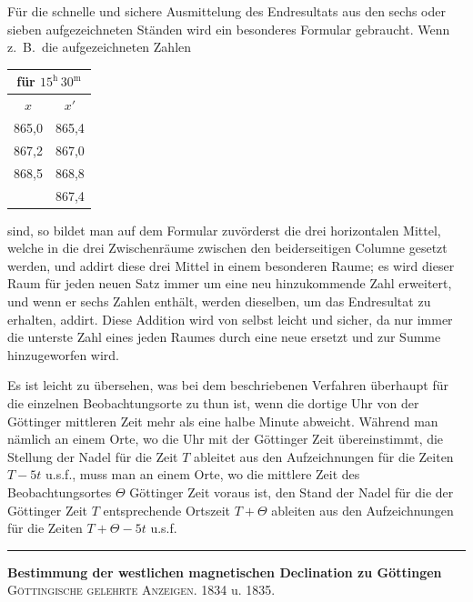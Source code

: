 \documentclass[12pt,a4paper]{article}
\begin{document}
\newpage
\noindent
F\"ur die schnelle und sichere Ausmittelung des Endresultats aus den sechs oder sieben aufgezeichneten St\"anden wird ein besonderes Formular gebraucht. Wenn z.~B.\ die aufgezeichneten Zahlen
\begin{center}
\begin{tabular}{c|c}
\multicolumn{2}{c}{f\"ur $15^{\text{h}}\,30^{\text{m}}$} \\
\hline
$x$ & $x'$ \\
\hline
865{,}0 & 865{,}4 \\
867{,}2 & 867{,}0 \\
868{,}5 & 868{,}8 \\
\hline
& 867{,}4
\end{tabular}
\end{center}

\noindent
sind, so bildet man auf dem Formular zuv\"orderst die drei horizontalen Mittel, welche in die drei Zwischenr\"aume zwischen den beiderseitigen Columne gesetzt werden, und addirt diese drei Mittel in einem besonderen Raume; es wird dieser Raum f\"ur jeden neuen Satz immer um eine neu hinzukommende Zahl erweitert, und wenn er sechs Zahlen enth\"alt, werden dieselben, um das Endresultat zu erhalten, addirt. Diese Addition wird von selbst leicht und sicher, da nur immer die unterste Zahl eines jeden Raumes durch eine neue ersetzt und zur Summe hinzugeworfen wird.

Es ist leicht zu \"ubersehen, was bei dem beschriebenen Verfahren \"uberhaupt f\"ur die einzelnen Beobachtungsorte zu thun ist, wenn die dortige Uhr von der G\"ottinger mittleren Zeit mehr als eine halbe Minute abweicht. W\"ahrend man n\"amlich an einem Orte, wo die Uhr mit der G\"ottinger Zeit \"ubereinstimmt, die Stellung der Nadel f\"ur die Zeit $T$ ableitet aus den Aufzeichnungen f\"ur die Zeiten $T-5t$ u.s.f., muss man an einem Orte, wo die mittlere Zeit des Beobachtungsortes $\Theta$ G\"ottinger Zeit voraus ist, den Stand der Nadel f\"ur die der G\"ottinger Zeit $T$ entsprechende Ortszeit $T+\Theta$ ableiten aus den Aufzeichnungen f\"ur die Zeiten $T+\Theta-5t$ u.s.f.

\bigskip
\begin{center}
\rule{0.5\textwidth}{0.4pt}
\end{center}

\bigskip
\noindent\textbf{Bestimmung der westlichen magnetischen Declination zu G\"ottingen}\\
\textsc{G\"ottingische gelehrte Anzeigen.} 1834 u. 1835.
\end{document}
